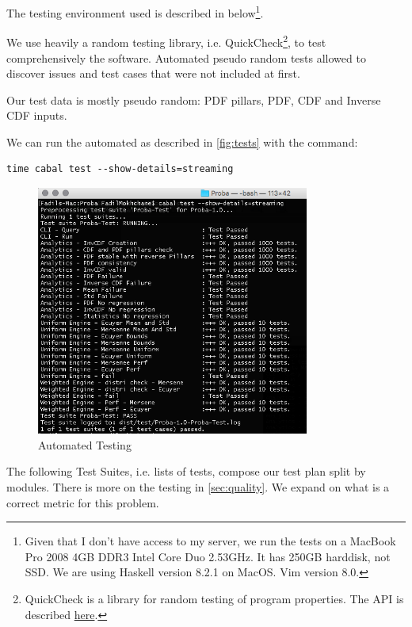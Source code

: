 \documentclass[12pt,a4paper,titlepage]{article}
\begin{document}
The testing environment used is described in below\footnote{
Given that I don't have access to my server, 
we run the tests on a MacBook Pro 2008 4GB DDR3 Intel Core Duo 2.53GHz.
It has 250GB harddisk, not SSD. 
We are using Haskell version 8.2.1 on MacOS. Vim version 8.0.
}.

We use heavily a random testing library, i.e. QuickCheck\footnote{
QuickCheck is a library for random testing of program properties.
The API is described 
\href{http://hackage.haskell.org/package/QuickCheck-2.10.0.1/docs/Test-QuickCheck.html}{here}.
}, to test comprehensively the software.
Automated pseudo random tests allowed to discover issues and
test cases that were not included at first.

Our test data is mostly pseudo random: 
PDF pillars, PDF, CDF and Inverse CDF inputs.

We can run the automated as described in  \autoref{fig:tests} with the command:
\begin{verbatim}
time cabal test --show-details=streaming
\end{verbatim}
\begin{figure}[h!]
\begin{center}
\includegraphics[width=0.8\textwidth]{img/tests.png}
\caption{Automated Testing}
\label{fig:tests}
\end{center}
\end{figure}

The following Test Suites, i.e. lists of tests, compose our test plan split by modules.
There is more on the testing in \autoref{sec:quality}. We expand on what is a correct 
metric for this problem.
\end{document}
